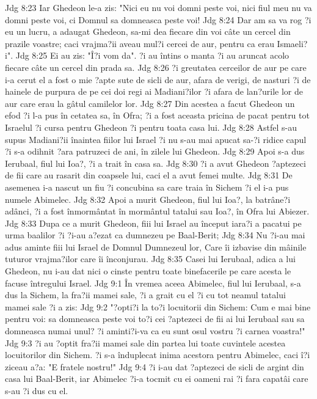 Jdg 8:23  Iar Ghedeon le-a zis: "Nici eu nu voi domni peste voi, nici fiul meu nu va domni peste voi, ci Domnul sa domneasca peste voi!
Jdg 8:24  Dar am sa va rog ?i eu un lucru, a adaugat Ghedeon, sa-mi dea fiecare din voi câte un cercel din prazile voastre; caci vrajma?ii aveau mul?i cercei de aur, pentru ca erau Ismaeli?i".
Jdg 8:25  Ei au zis: "Î?i vom da". ?i au întins o manta ?i au aruncat acolo fiecare câte un cercel din prada sa.
Jdg 8:26  ?i greutatea cerceilor de aur pe care i-a cerut el a fost o mie ?apte sute de sicli de aur, afara de verigi, de nasturi ?i de hainele de purpura de pe cei doi regi ai Madiani?ilor ?i afara de lan?urile lor de aur care erau la gâtul camilelor lor.
Jdg 8:27  Din acestea a facut Ghedeon un efod ?i l-a pus în cetatea sa, în Ofra; ?i a fost aceasta pricina de pacat pentru tot Israelul ?i cursa pentru Ghedeon ?i pentru toata casa lui.
Jdg 8:28  Astfel s-au supus Madiani?ii înaintea fiilor lui Israel ?i nu s-au mai apucat sa-?i ridice capul ?i s-a odihnit ?ara patruzeci de ani, în zilele lui Ghedeon.
Jdg 8:29  Apoi s-a dus Ierubaal, fiul lui Ioa?, ?i a trait în casa sa.
Jdg 8:30  ?i a avut Ghedeon ?aptezeci de fii care au rasarit din coapsele lui, caci el a avut femei multe.
Jdg 8:31  De asemenea i-a nascut un fiu ?i concubina sa care traia în Sichem ?i el i-a pus numele Abimelec.
Jdg 8:32  Apoi a murit Ghedeon, fiul lui Ioa?, la batrâne?i adânci, ?i a fost înmormântat în mormântul tatalui sau Ioa?, în Ofra lui Abiezer.
Jdg 8:33  Dupa ce a murit Ghedeon, fiii lui Israel au început iara?i a pacatui pe urma baalilor ?i ?i-au a?ezat ca dumnezeu pe Baal-Berit;
Jdg 8:34  Nu ?i-au mai adus aminte fiii lui Israel de Domnul Dumnezeul lor, Care îi izbavise din mâinile tuturor vrajma?ilor care îi înconjurau.
Jdg 8:35  Casei lui Ierubaal, adica a lui Ghedeon, nu i-au dat nici o cinste pentru toate binefacerile pe care acesta le facuse întregului Israel.
Jdg 9:1  În vremea aceea Abimelec, fiul lui Ierubaal, s-a dus la Sichem, la fra?ii mamei sale, ?i a grait cu el ?i cu tot neamul tatalui mamei sale ?i a zis:
Jdg 9:2  "?opti?i la to?i locuitorii din Sichem: Cum e mai bine pentru voi: sa domneasca peste voi to?i cei ?aptezeci de fii ai lui Ierubaal sau sa domneasca numai unul? ?i aminti?i-va ca eu sunt osul vostru ?i carnea voastra!"
Jdg 9:3  ?i au ?optit fra?ii mamei sale din partea lui toate cuvintele acestea locuitorilor din Sichem. ?i s-a înduplecat inima acestora pentru Abimelec, caci î?i ziceau a?a: "E fratele nostru!"
Jdg 9:4  ?i i-au dat ?aptezeci de sicli de argint din casa lui Baal-Berit, iar Abimelec ?i-a tocmit cu ei oameni rai ?i fara capatâi care s-au ?i dus cu el.

